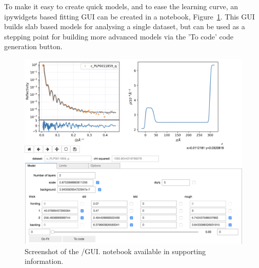 \documentclass[12pt]{article}
\begin{document}
To make it easy to create quick models, and to ease the learning curve, an ipywidgets \cite{ipywidgets} based fitting GUI can be created in a \Jupyter notebook, Figure~\ref{fig:gui}. This GUI builds slab based models for analysing a single dataset, but can be used as a stepping point for building more advanced models via the 'To code' code generation button.

\begin{figure}
  \includegraphics[width=\linewidth]{./datasets/gui.png}
  \caption{Screenshot of the \Jupyter/\ipywidgets GUI. \Jupyter notebook available in supporting information.}
  \label{fig:gui}
\end{figure}
\end{document}
